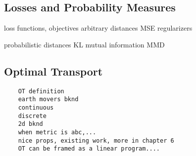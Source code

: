 \subsection{Losses and Probability Measures}
loss functions, objectives
arbitrary distances
MSE
regularizers

probabilistic distances
KL
mutual information
MMD

\subsection{Optimal Transport}	
\begin{verbatim}
	OT definition
	earth movers bknd
	continuous
	discrete
	2d bknd
	when metric is abc,...
	nice props, existing work, more in chapter 6
    OT can be framed as a linear program....
\end{verbatim}
    
